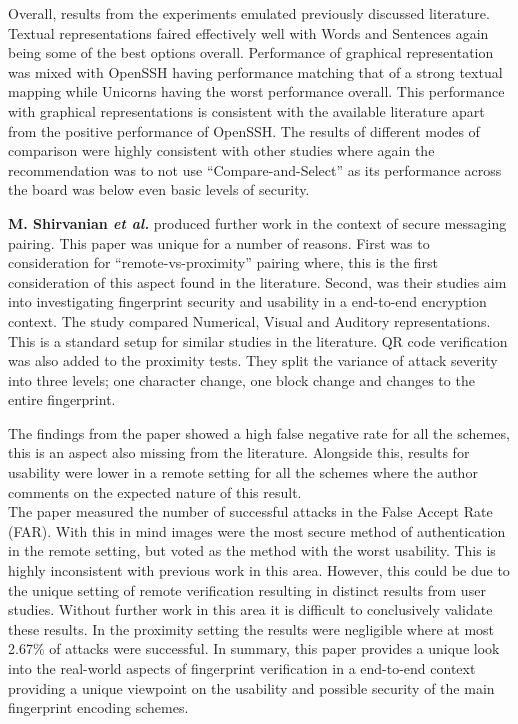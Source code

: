 Overall, results from the experiments emulated previously discussed literature. Textual representations faired effectively well with Words and Sentences again being some of the best options overall. Performance of graphical representation was mixed with OpenSSH having performance matching that of a strong textual mapping while Unicorns having the worst performance overall. This performance with graphical representations is consistent with the available literature apart from the positive performance of OpenSSH. The results of different modes of comparison were highly consistent with other studies where again the recommendation was to not use ``Compare-and-Select'' as its performance across the board was below even basic levels of security.

\textbf{M. Shirvanian \textit{et al.}}\cite{shirvanian2017pitfalls} produced further work in the context of secure messaging pairing. This paper was unique for a number of reasons. First was to consideration for ``remote-vs-proximity'' pairing where, this is the first consideration of this aspect found in the literature. Second, was their studies aim into investigating fingerprint security and usability in a end-to-end encryption context. The study compared Numerical, Visual and Auditory representations. This is a standard setup for similar studies in the literature. QR code verification was also added to the proximity tests. They split the variance of attack severity into three levels; one character change, one block change and changes to the entire fingerprint.

The findings from the paper showed a high false negative rate for all the schemes, this is an aspect also missing from the literature. Alongside this, results for usability were lower in a remote setting for all the schemes where the author comments on the expected nature of this result.\\
The paper measured the number of successful attacks in the False Accept Rate (FAR). With this in mind images were the most secure method of authentication in the remote setting, but voted as the method with the worst usability. This is highly inconsistent with previous work in this area. However, this could be due to the unique setting of remote verification resulting in distinct results from user studies. Without further work in this area it is difficult to conclusively validate these results. In the proximity setting the results were negligible where at most 2.67\% of attacks were successful. In summary, this paper provides a unique look into the real-world aspects of fingerprint verification in a end-to-end context providing a unique viewpoint on the usability and possible security of the main fingerprint encoding schemes.

